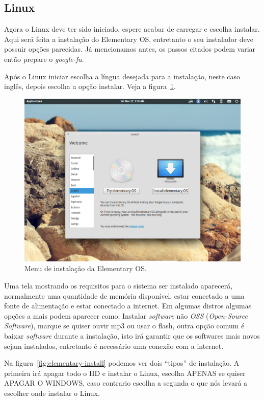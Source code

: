 \documentclass{handout_utfpr}
\begin{document}
\subsection{Linux}

Agora o Linux deve ter sido iniciado, espere acabar de carregar e escolha instalar. Aqui será feita a instalação do Elementary OS, entretanto o seu instalador deve possuir opções parecidas. Já mencionamos antes, os passos citados podem variar então prepare o \emph{google-fu}.

Após o Linux iniciar escolha a língua desejada para a instalação, neste caso inglês, depois escolha a opção instalar. Veja a figura~\ref{fig:elementary-menu}.

\begin{figure}[H]
  \centering
  \includegraphics[scale=.3]{imagens/elementary-install-01.png}
  \caption{Menu de instalação da Elementary OS\@.}
  \label{fig:elementary-menu}
\end{figure}

Uma tela mostrando os requisitos para o sistema ser instalado aparecerá, normalmente uma quantidade de memória disponível, estar conectado a uma fonte de alimentação e estar conectado a internet. Em algumas distros algumas opções a mais podem aparecer como: Instalar \textit{software} não \textit{OSS} (\textit{Open-Source Software}), marque se quiser ouvir mp3 ou usar o flash, outra opção comum é baixar \textit{software} durante a instalação, isto irá garantir que os softwares mais novos sejam instalados, entretanto é necessário uma conexão com a internet.

Na figura~\ref{fig:elementary-install} podemos ver dois ``tipos'' de instalação. A primeira irá apagar todo o HD e instalar o Linux, escolha APENAS se quiser APAGAR O WINDOWS, caso contrario escolha a segunda o que nós levará a escolher onde instalar o Linux.
\end{document}
